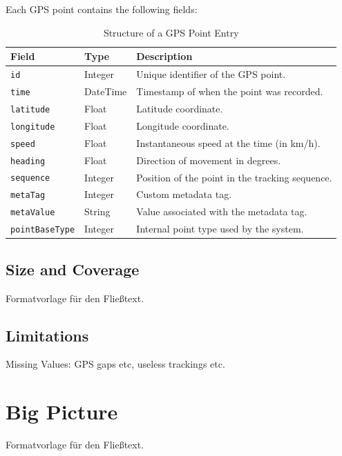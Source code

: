\documentclass[a4paper,12pt,twoside]{scrreprt}
\begin{document}
Each GPS point contains the following fields:
\begin{table}[H]
  \centering
  \caption{Structure of a GPS Point Entry}
  \label{tab:gps_point_structure}
  \begin{tabular}{|l|l|p{8cm}|}
    \hline
    \textbf{Field}         & \textbf{Type} & \textbf{Description}
    \\
    \hline
    \texttt{id}            & Integer       & Unique identifier of the GPS
    point.
    \\
    \hline
    \texttt{time}          & DateTime      & Timestamp of when the point was
    recorded.
    \\
    \hline
    \texttt{latitude}      & Float         & Latitude coordinate.
    \\
    \hline
    \texttt{longitude}     & Float         & Longitude coordinate.
    \\
    \hline
    \texttt{speed}         & Float         & Instantaneous speed at the time
    (in km/h).
    \\
    \hline
    \texttt{heading}       & Float         & Direction of movement in degrees.
    \\
    \hline
    \texttt{sequence}      & Integer       & Position of the point in the
    tracking
    sequence.
    \\
    \hline
    \texttt{metaTag}       & Integer       & Custom metadata tag.
    \\
    \hline
    \texttt{metaValue}     & String        & Value associated with the metadata
    tag.
    \\
    \hline
    \texttt{pointBaseType} & Integer       & Internal point type used by the
    system.
    \\
    \hline
  \end{tabular}
\end{table}

\clearpage
\subsection{Size and Coverage}
Formatvorlage für den Fließtext.

\subsection{Limitations}
Missing Values: GPS gaps etc, useless trackings etc.

\section{Big Picture}
Formatvorlage für den Fließtext.
\end{document}

